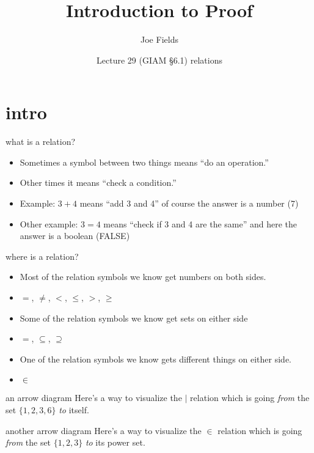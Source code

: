 \documentclass[handout,landscape]{beamer}
\author{Joe Fields}
\title{Introduction to Proof}
\date{Lecture 29 (GIAM \S 6.1) \newline relations}
\institute[SCSU]{ {\tt fieldsj1@southernct.edu} }
\begin{document}
\begin{frame}[plain]
  \titlepage
\end{frame}

\section{intro}

\begin{frame}{what is a relation?}
\begin{itemize}
\item Sometimes a symbol between two things means ``do an operation.'' \pause
\item Other times it means ``check a condition.'' \pause
\item Example: $3+4$ means ``add 3 and 4'' of course the answer is a number (7) \pause
\item Other example: $3=4$ means ``check if 3 and 4 are the same'' and here the answer is a boolean (FALSE)\pause
\end{itemize}
\end{frame}

\begin{frame}{where is a relation?}
\begin{itemize}
\item Most of the relation symbols we know get numbers on both sides. \pause
\item $=$,  $\neq$, $<$, $\leq$, $>$, $\geq$ \pause
\item Some of the relation symbols we know get sets on either side \pause
\item $=$, $\subseteq$, $\supseteq$ \pause
\item One of the relation symbols we know gets different things on either side. \pause
\item $\in$
\end{itemize}
\end{frame}

\begin{frame}{an arrow diagram}
Here's a way to visualize the $\mid$ relation which is going {\em from} the set $\{1,2,3,6\}$ {\em to} itself.

\begin{center}

\end{center}   
\end{frame}
\begin{frame}{another arrow diagram}
Here's a way to visualize the $\in$ relation which is going {\em from} the set $\{1,2,3\}$ {\em to} its power set.

\begin{center}

\end{center}   
\end{frame}
\end{document}
